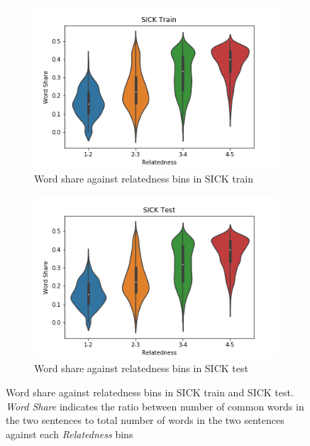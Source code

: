 \begin{enumerate}
\begin{figure}
	\captionsetup[subfigure]{justification=centering}
	\centering
	\begin{subfigure}[b]{.5\textwidth}
		\centering
		\includegraphics[width=\textwidth]{figures/semantic_textual_similarity/introduction/sick_train_word_share.png}
		\caption{Word share against relatedness bins in SICK train}
		\label{fig:sick_train_word_share}
	\end{subfigure}%
	\begin{subfigure}[b]{.5\textwidth}
		\centering
		\includegraphics[width=\textwidth]{figures/semantic_textual_similarity/introduction/sick_test_word_share.png}
		\caption{Word share against relatedness bins in SICK test}
		\label{fig:sick_test_word_share}
	\end{subfigure}
	\caption[Word share against relatedness bins in SICK train and SICK test.]{Word share against relatedness bins in SICK train and SICK test. \textit{Word Share} indicates the ratio between number of common words in the two sentences to total number of words in the two sentences against each \textit{Relatedness} bins}
	\label{fig:sick_word_share}
\end{figure}




\end{enumerate}
